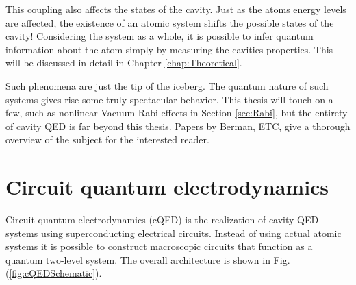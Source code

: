 \documentclass[12 pt]{book}
\begin{document}
This coupling also affects the states of the cavity. Just as the atoms energy levels are affected, the existence of an atomic system shifts the possible states of the cavity! Considering the system as a whole, it is possible to infer quantum information about the atom simply by measuring the cavities properties. This will be discussed in detail in Chapter \ref{chap:Theoretical}. 

Such phenomena are just the tip of the iceberg. The quantum nature of such systems gives rise some truly spectacular behavior. This thesis will touch on a few, such as nonlinear Vacuum Rabi effects in Section \ref{sec:Rabi}, but the entirety of cavity QED is far beyond this thesis. Papers by Berman\cite{Berman}, ETC, give a thorough overview of the subject for the interested reader. 






\section{Circuit quantum electrodynamics}
Circuit quantum electrodynamics (cQED) is the realization of cavity QED systems using superconducting electrical circuits. Instead of using actual atomic systems it is possible to construct macroscopic circuits that function as a quantum two-level system. The overall architecture is shown in Fig. (\ref{fig:cQEDSchematic}).
\end{document}
